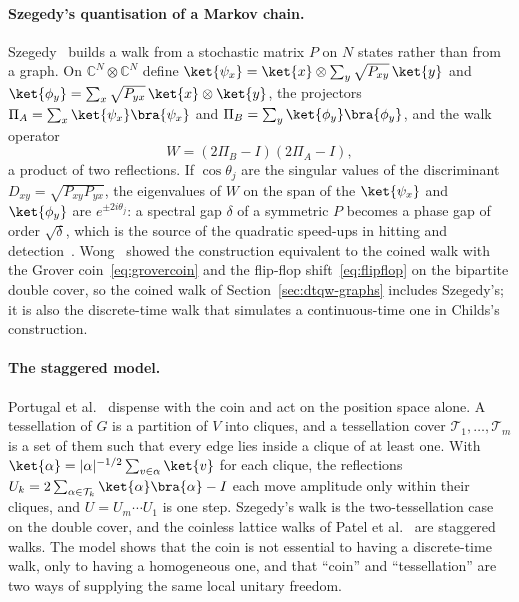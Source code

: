 \paragraph*{Szegedy's quantisation of a Markov chain.}
\label{sec:szegedy}
Szegedy~\cite{Szegedy} builds a walk from a stochastic matrix $P$ on $N$
states rather than from a graph. On $\mathbb{C}^N \otimes \mathbb{C}^N$
define $\ket{\psi_x} = \ket{x} \otimes \sum_y \sqrt{P_{xy}}\,\ket{y}$ and
$\ket{\phi_y} = \sum_x \sqrt{P_{yx}}\,\ket{x} \otimes \ket{y}$, the projectors
$\Pi_A = \sum_x \ket{\psi_x}\bra{\psi_x}$ and $\Pi_B = \sum_y
\ket{\phi_y}\bra{\phi_y}$, and the walk operator
\begin{equation}
	W = (2\Pi_B - I)(2\Pi_A - I),
	\label{eq:szegedy}
\end{equation}
a product of two reflections. If $\cos\theta_j$ are the singular values of
the discriminant $D_{xy} = \sqrt{P_{xy}P_{yx}}$, the eigenvalues of $W$ on
the span of the $\ket{\psi_x}$ and $\ket{\phi_y}$ are $e^{\pm 2i\theta_j}$:
a spectral gap $\delta$ of a symmetric $P$ becomes a phase gap of order
$\sqrt{\delta}$, which is the source of the quadratic speed-ups in hitting
and detection~\cite{Magniez_2007}. Wong~\cite{G_2017} showed the construction
equivalent to the coined walk with the Grover coin~\eqref{eq:grovercoin} and
the flip-flop shift~\eqref{eq:flipflop} on the bipartite double cover, so the
coined walk of Section~\ref{sec:dtqw-graphs} includes Szegedy's; it is also
the discrete-time walk that simulates a continuous-time one in Childs's
construction.

\paragraph*{The staggered model.}
\label{sec:staggered}
Portugal et al.~\cite{Portugal_2016} dispense with the coin and act on the
position space alone. A tessellation of $G$ is a partition of $V$ into
cliques, and a tessellation cover $\mathcal{T}_1, \ldots, \mathcal{T}_m$ is a
set of them such that every edge lies inside a clique of at least one. With
$\ket{\alpha} = |\alpha|^{-1/2}\sum_{v\in\alpha}\ket{v}$ for each clique, the
reflections $U_k = 2\sum_{\alpha \in \mathcal{T}_k}\ket{\alpha}\bra{\alpha} -
I$ each move amplitude only within their cliques, and $U = U_m \cdots U_1$ is
one step. Szegedy's walk is the two-tessellation case on the double cover,
and the coinless lattice walks of Patel et al.~\cite{Patel_2004} are
staggered walks. The model shows that the coin is not essential to having a
discrete-time walk, only to having a homogeneous one, and that ``coin'' and
``tessellation'' are two ways of supplying the same local unitary freedom.

